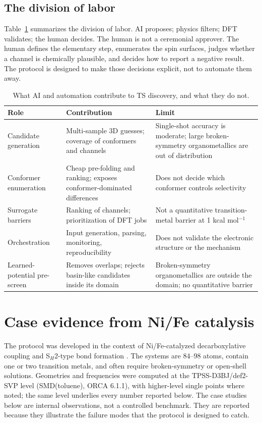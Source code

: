 \documentclass[11pt,a4paper]{article}
\begin{document}
\subsection{The division of labor}

Table~\ref{tab:ai} summarizes the division of labor. AI proposes; physics filters; DFT validates; the human decides. The human is not a ceremonial approver. The human defines the elementary step, enumerates the spin surfaces, judges whether a channel is chemically plausible, and decides how to report a negative result. The protocol is designed to make those decisions explicit, not to automate them away.

\begin{table}[t]
\centering
\caption{What AI and automation contribute to TS discovery, and what they do not.}
\label{tab:ai}
\small
\begin{tabularx}{\linewidth}{@{}>{\raggedright\arraybackslash}p{3.6cm}>{\raggedright\arraybackslash}X >{\raggedright\arraybackslash}X@{}}
\toprule
Role & Contribution & Limit \\
\midrule
Candidate generation & Multi-sample 3D guesses; coverage of conformers and channels & Single-shot accuracy is moderate; large broken-symmetry organometallics are out of distribution \\
Conformer enumeration & Cheap pre-folding and ranking; exposes conformer-dominated differences & Does not decide which conformer controls selectivity \\
Surrogate barriers & Ranking of channels; prioritization of DFT jobs & Not a quantitative transition-metal barrier at 1 kcal mol$^{-1}$ \\
Orchestration & Input generation, parsing, monitoring, reproducibility & Does not validate the electronic structure or the mechanism \\
Learned-potential pre-screen & Removes overlaps; rejects basin-like candidates inside its domain & Broken-symmetry organometallics are outside the domain; no quantitative barrier \\
\bottomrule
\end{tabularx}
\end{table}

\section{Case evidence from Ni/Fe catalysis}

The protocol was developed in the context of Ni/Fe-catalyzed decarboxylative coupling and S$_H$2-type bond formation \citep{Tsymbal2022SH2}. The systems are 84--98 atoms, contain one or two transition metals, and often require broken-symmetry or open-shell solutions. Geometries and frequencies were computed at the TPSS-D3BJ/def2-SVP level (SMD(toluene), ORCA 6.1.1), with higher-level single points where noted; the same level underlies every number reported below. The case studies below are internal observations, not a controlled benchmark. They are reported because they illustrate the failure modes that the protocol is designed to catch.
\end{document}
